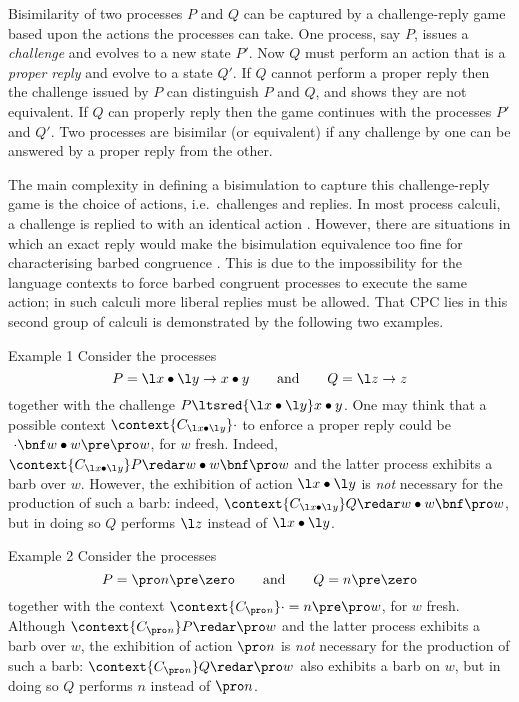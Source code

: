 \documentclass{LMCS}
\begin{document}
Bisimilarity of two processes $P$ and $Q$ can be captured by a challenge-reply game 
based upon the actions the processes can take.
One process, say $P$, issues a {\em challenge} and evolves to a new state $P'$.
Now $Q$ must perform an action that is a {\em proper reply} and evolve to a state $Q'$.
If $Q$ cannot perform a proper reply then the challenge issued by $P$ can distinguish $P$ and $Q$, 
and shows they are not equivalent.
If $Q$ can properly reply then the game continues with the processes $P'$ and $Q'$.
Two processes are bisimilar (or equivalent) if any challenge by one
can be answered by a proper reply from the other. 

The main complexity in defining a bisimulation to capture this challenge-reply game is the choice of actions, i.e.\ challenges and replies.
In most process calculi, a challenge is replied to with an identical action \cite{Mil89,milner.parrow.ea:calculus-mobile}.
However, there are situations in which an exact reply would make the bisimulation equivalence too fine for characterising barbed congruence \cite{amadio.castellani.ea:bisimulations-asynchronous,DGP:IC07}.
This is due to the impossibility for the language contexts to force barbed congruent processes to execute the same action; in such calculi more liberal replies must be allowed. That CPC lies in this second group of calculi is demonstrated by the following two examples.

\begin{exa}{Example 1}
\label{ex:input}
Consider the processes
\[
P = \l x \bullet \l y \to x\bullet y
\qquad \mbox{and} \qquad
Q = \l z \to z
\]
together with the challenge $P \ltsred{\l x \bullet \l y} x \bullet y$.
One may think that a possible context
$\context {C_{{\it \l x \bullet \l y}}} \cdot$
to enforce a proper reply could be $\ \cdot\bnf w \bullet w \pre \pro w$, for $w$ fresh.
Indeed, $\context {C_{{\it \l x\bullet\l y}}} P\redar w\bullet w \bnf \pro w$
and the latter process exhibits a barb over $w$.
However, the exhibition of action $\l x \bullet \l y$ is {\em not} necessary
for the production of such a barb: indeed,
$\context {C_{{\it \l x\bullet\l y}}} Q\redar w\bullet w \bnf \pro w$,
but in doing so $Q$ performs $\l z$ instead of $\l x \bullet \l y$.
\end{exa}

\begin{exa}{Example 2}
\label{ex:pro}
Consider the processes
\[
P = \pro n \pre \zero
\qquad \mbox{and} \qquad
Q = n\pre \zero
\]
together with the context $\context {C_{{\it \pro n}}} \cdot = n\pre\pro w$, for $w$ fresh.
Although $\context {C_{{\it \pro n}}} P\redar\pro w$ and the latter process exhibits a barb over $w$,
the exhibition of action $\pro n$ is {\em not} necessary for the production of such a barb:
$\context {C_{{\it \pro n}}} Q\redar\pro w$ also exhibits a barb on $w$,
but in doing so $Q$ performs $n$ instead of $\pro n$.
\end{exa}
\end{document}
